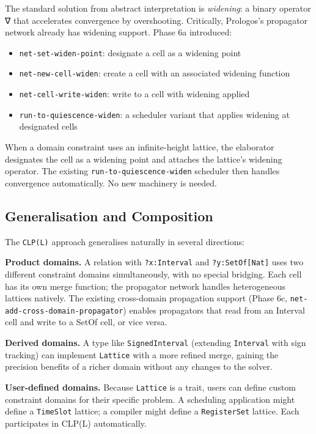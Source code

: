 \documentclass[11pt]{article}
\begin{document}
The standard solution from abstract interpretation is \emph{widening}: a binary
operator ∇ that accelerates convergence by overshooting. Critically, Prologos's
propagator network already has widening support. Phase 6a introduced:

\begin{itemize}
\item \texttt{net-set-widen-point}: designate a cell as a widening point
\item \texttt{net-new-cell-widen}: create a cell with an associated widening function
\item \texttt{net-cell-write-widen}: write to a cell with widening applied
\item \texttt{run-to-quiescence-widen}: a scheduler variant that applies widening at
designated cells
\end{itemize}

When a domain constraint uses an infinite-height lattice, the elaborator
designates the cell as a widening point and attaches the lattice's widening
operator. The existing \texttt{run-to-quiescence-widen} scheduler then handles
convergence automatically. No new machinery is needed.
\subsection{Generalisation and Composition}
\label{sec:orga0c02cd}

The \texttt{CLP(L)} approach generalises naturally in several directions:

\textbf{Product domains.} A relation with \texttt{?x:Interval} and \texttt{?y:SetOf[Nat]} uses two
different constraint domains simultaneously, with no special bridging. Each cell
has its own merge function; the propagator network handles heterogeneous lattices
natively. The existing cross-domain propagation support (Phase 6c,
\texttt{net-add-cross-domain-propagator}) enables propagators that read from an Interval
cell and write to a SetOf cell, or vice versa.

\textbf{Derived domains.} A type like \texttt{SignedInterval} (extending \texttt{Interval} with sign
tracking) can implement \texttt{Lattice} with a more refined merge, gaining the
precision benefits of a richer domain without any changes to the solver.

\textbf{User-defined domains.} Because \texttt{Lattice} is a trait, users can define custom
constraint domains for their specific problem. A scheduling application might
define a \texttt{TimeSlot} lattice; a compiler might define a \texttt{RegisterSet} lattice.
Each participates in CLP(L) automatically.
\end{document}
